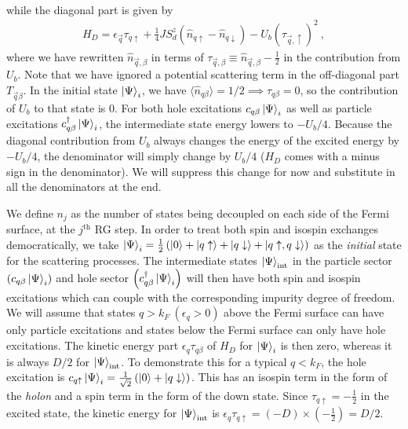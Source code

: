\documentclass[reprint,superscriptaddress,floatfix]{revtex4-2}
\begin{document}
\begin{widetext}
\begin{equation}
\begin{aligned}
\end{aligned}\end{equation}
while the diagonal part is given by
\begin{equation}\begin{aligned}
	H_D = \epsilon_{\vec q} \tau_{q\uparrow} + \frac{1}{4}J S_d^z\left(\hat n_{q \uparrow} - \hat n_{q \downarrow}\right) - U_b \left(\tau_{\vec q,\uparrow}\right)^2~,
\end{aligned}\end{equation}
where we have rewritten \(\hat n_{\vec q,\beta}\) in terms of \(\tau_{\vec q,\beta} \equiv \hat n_{\vec q,\beta} - \frac{1}{2}\) in the contribution from \(U_b\). Note that we have ignored a potential scattering term in the off-diagonal part \(T_{\vec q\beta}\). In the initial state \(\ket{\Psi}_i\), we have \(\langle \hat n_{q\beta} \rangle = 1/2 \implies \tau_{q\beta} = 0\), so the contribution of \(U_b\) to that state is 0. For both hole excitations \(c_{q\beta}\ket{\Psi}_i\) as well as particle excitations \(c^\dagger_{q\beta}\ket{\Psi}_i\), the intermediate state energy lowers to \(-U_b/4\). Because the diagonal contribution from \(U_b\) always changes the energy of the excited energy by \(-U_b/4\),  the denominator will simply change by \(U_b/4\) (\(H_D\) comes with a minus sign in the denominator). We will suppress this change for now and substitute in all the denominators at the end.

We define \(n_j\) as the number of states being decoupled on each side of the Fermi surface, at the \(j^\text{th}\) RG step. In order to treat both spin and isospin exchanges democratically, we take \(\ket{\Psi}_i = \frac{1}{2}\left(\ket{0} + \ket{q\uparrow} + \ket{q\downarrow} + \ket{q\uparrow, q\downarrow}\right) \) as the \textit{initial} state for the scattering processes. The intermediate states \(\ket{\Psi}_\text{int}\) in the particle sector \(\left(c_{q\beta}\ket{\Psi}_i\right)\) and hole sector \(\left(c^\dagger_{q\beta}\ket{\Psi}_i\right)\) will then have both spin and isospin excitations which can couple with the corresponding impurity degree of freedom. We will assume that states  \(q > k_F~\left(\epsilon_q > 0\right) \) above the Fermi surface can have only particle excitations and states below the Fermi surface can only have hole excitations. The kinetic energy part \(\epsilon_q \tau_{q\beta}\) of \(H_D\) for \(\ket{\Psi}_i\) is then zero, whereas it is always \(D/2\) for \(\ket{\Psi}_\text{int}\). To demonstrate this for a typical \(q < k_F\), the hole excitation is \(c_{q \uparrow}\ket{\Psi}_i = \frac{1}{\sqrt 2}\left(\ket{0} + \ket{q \downarrow}\right)\). This has an isospin term in the form of the \textit{holon} and a spin term in the form of the down state. Since \(\tau_{q \uparrow} = -\frac{1}{2}\) in the excited state, the kinetic energy for \(\ket{\Psi}_\text{int}\) is \(\epsilon_q \tau_{q \uparrow} = \left(-D\right)\times\left(-\frac{1}{2}\right) = D/2\).



\end{widetext}
\end{document}
